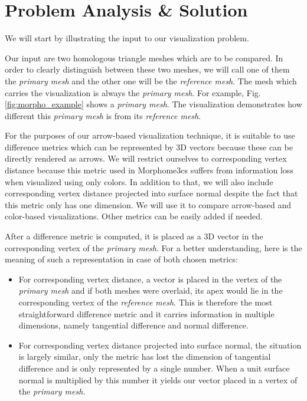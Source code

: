 \chapter{Problem Analysis \& Solution}
\label{sec:analysis}

We will start by illustrating the input to our visualization problem.

Our input are two homologous triangle meshes which are to be compared. In order to clearly distinguish between these two meshes, we will call one of them the {\it primary mesh} and the other one will be the {\it reference mesh}. The mesh which carries the visualization is always the {\it primary mesh}. For example, Fig. \ref{fig:morpho_example} shows a {\it primary mesh}. The visualization demonstrates how different this {\it primary mesh} is from its {\it reference mesh}.

For the purposes of our arrow-based visualization technique, it is suitable to use difference metrics which can be represented by 3D vectors because these can be directly rendered as arrows. We will restrict ourselves to corresponding vertex distance because this metric used in Morphome3cs suffers from information loss when visualized using only colors. In addition to that, we will also include corresponding vertex distance projected into surface normal despite the fact that this metric only has one dimension. We will use it to compare arrow-based and color-based visualizations. Other metrics can be easily added if needed.

After a difference metric is computed, it is placed as a 3D vector in the corresponding vertex of the {\it primary mesh}. For a better understanding, here is the meaning of such a representation in case of both chosen metrics:

\begin{itemize}
\item For corresponding vertex distance, a vector is placed in the vertex of the {\it primary mesh} and if both meshes were overlaid, its apex would lie in the corresponding vertex of the {\it reference mesh}. This is therefore the most straightforward difference metric and it carries information in multiple dimensions, namely tangential difference and normal difference.
\item For corresponding vertex distance projected into surface normal, the situation is largely similar, only the metric has lost the dimension of tangential difference and is only represented by a single number. When a unit surface normal is multiplied by this number it yields our vector placed in a vertex of the {\it primary mesh}.
\end{itemize}

